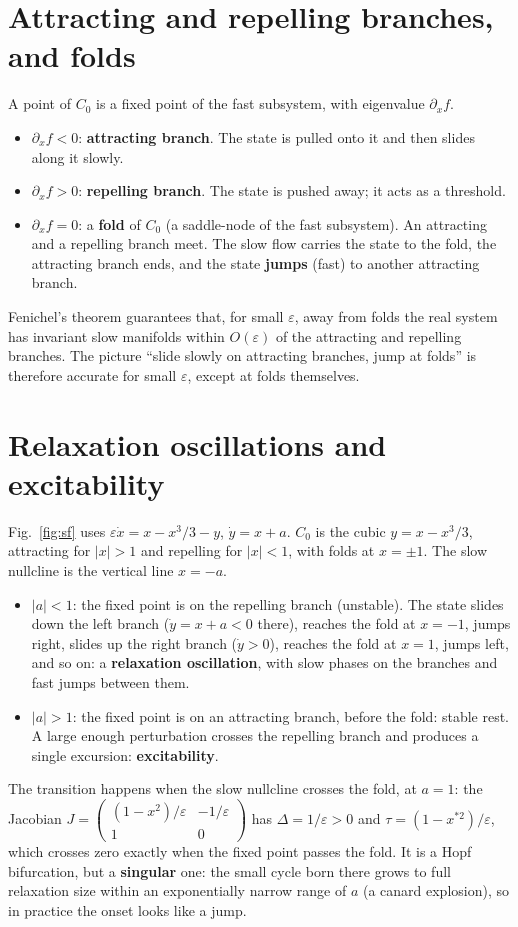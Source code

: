 \documentclass[11pt,openany]{report}
\newcommand{\eps}{\varepsilon}
\begin{document}
\section{Attracting and repelling branches, and folds}
A point of $C_0$ is a fixed point of the fast subsystem, with eigenvalue $\partial_x f$.
\begin{itemize}
\item $\partial_x f<0$: \textbf{attracting branch}. The state is pulled onto it and then slides along it slowly.
\item $\partial_x f>0$: \textbf{repelling branch}. The state is pushed away; it acts as a threshold.
\item $\partial_x f = 0$: a \textbf{fold} of $C_0$ (a saddle-node of the fast subsystem). An attracting and a repelling
branch meet. The slow flow carries the state to the fold, the attracting branch ends, and the state \textbf{jumps}
(fast) to another attracting branch.
\end{itemize}
Fenichel's theorem guarantees that, for small $\eps$, away from folds the real system has invariant slow manifolds within
$O(\eps)$ of the attracting and repelling branches. The picture ``slide slowly on attracting branches, jump at folds'' is
therefore accurate for small $\eps$, except at folds themselves.

\section{Relaxation oscillations and excitability}
Fig.~\ref{fig:sf} uses $\eps\dot x = x - x^3/3 - y$, $\dot y = x + a$. $C_0$ is the cubic $y = x - x^3/3$, attracting
for $|x|>1$ and repelling for $|x|<1$, with folds at $x = \pm1$. The slow nullcline is the vertical line $x = -a$.
\begin{itemize}
\item $|a|<1$: the fixed point is on the repelling branch (unstable). The state slides down the left branch ($\dot y = x
+ a < 0$ there), reaches the fold at $x=-1$, jumps right, slides up the right branch ($\dot y>0$), reaches the fold at
$x=1$, jumps left, and so on: a \textbf{relaxation oscillation}, with slow phases on the branches and fast jumps between
them.
\item $|a|>1$: the fixed point is on an attracting branch, before the fold: stable rest. A large enough perturbation
crosses the repelling branch and produces a single excursion: \textbf{excitability}.
\end{itemize}
The transition happens when the slow nullcline crosses the fold, at $a=1$: the Jacobian
$J=\begin{pmatrix}(1-x^2)/\eps & -1/\eps\\ 1 & 0\end{pmatrix}$ has $\Delta = 1/\eps>0$ and $\tau = (1-x^{*2})/\eps$, which
crosses zero exactly when the fixed point passes the fold. It is a Hopf bifurcation, but a \textbf{singular} one: the
small cycle born there grows to full relaxation size within an exponentially narrow range of $a$ (a canard explosion),
so in practice the onset looks like a jump.
\end{document}

